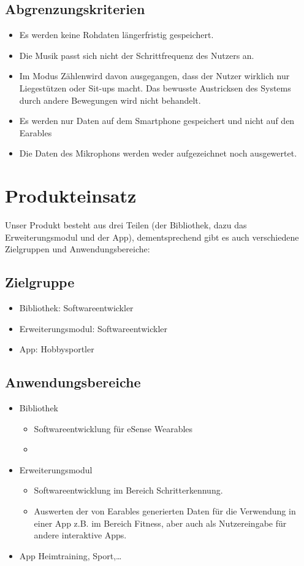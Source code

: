 \documentclass[a4paper,12pt]{article}
\begin{document}
  \subsection{Abgrenzungskriterien}
  \begin{itemize}
    \item Es werden keine \Gls{Rohdaten} längerfristig gespeichert.
    \item Die Musik passt sich nicht der \Gls{Schrittfrequenz} des Nutzers an.
    \item Im Modus \glqq Zählen\grqq{}wird davon ausgegangen, dass der Nutzer wirklich nur Liegestützen oder Sit-ups macht. Das bewusste Austricksen des Systems durch andere Bewegungen wird nicht behandelt.
    \item Es werden nur Daten auf dem Smartphone gespeichert und nicht auf den \Gls{Earables}
    \item Die Daten des Mikrophons werden weder aufgezeichnet noch ausgewertet.
  \end{itemize}

\section{Produkteinsatz}
Unser Produkt besteht aus drei Teilen (der Bibliothek, dazu das Erweiterungsmodul und der App), dementsprechend gibt es auch verschiedene Zielgruppen und Anwendungsbereiche:
  \subsection{Zielgruppe}
  \begin{itemize}
    \item\textsf{Bibliothek:} Softwareentwickler
    \item\textsf{Erweiterungsmodul:} Softwareentwickler
    \item\textsf{App:} Hobbysportler
  \end{itemize}
  \subsection{Anwendungsbereiche}
    \begin{itemize}
      \item\textsf{Bibliothek} \begin{itemize}
        \item[] Softwareentwicklung für eSense Wearables 
        \item[] %
      \end{itemize}
      \item\textsf{Erweiterungsmodul}
      \begin{itemize}
        \item[] Softwareentwicklung im Bereich Schritterkennung.
        \item[] Auswerten der von \Gls{Earables} generierten Daten für die Verwendung in einer App z.B. im Bereich Fitness, aber auch als Nutzereingabe für andere interaktive Apps.
      \end{itemize}
      \item\textsf{App} Heimtraining, Sport,\dots
    \end{itemize}
\end{document}
